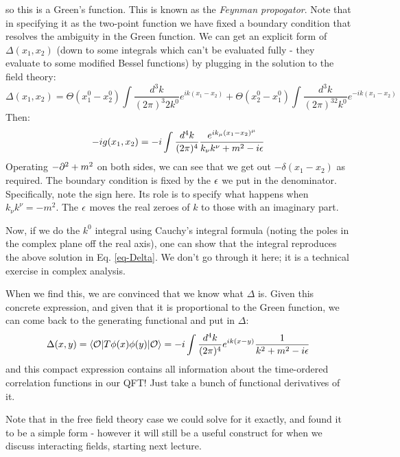 so this is a Green's function.
This is known as the \emph{Feynman propogator}. Note that in specifying it as the two-point function we have fixed a boundary condition that resolves the ambiguity in the Green function. We can get an explicit form of $\Delta(x_1, x_2)$ (down to some integrals which can't be evaluated fully - they evaluate to some modified Bessel functions) by plugging in the solution to the field theory:
\begin{equation}\label{eq-Delta}
    \Delta(x_1, x_2) = \Theta(x_1^0 - x_2^0) \int \frac{d^3k}{(2\pi)^3 2k^0}e^{ik(x_1 - x_2)} + \Theta(x_2^0 - x_1^0)\int \frac{d^3k}{(2\pi)^32k^0} e^{-ik(x_1 - x_2)}
\end{equation}
Then:
\begin{equation}
    -ig(x_1, x_2) = -i\int \frac{d^4k}{(2\pi)^4} \frac{e^{ik_\mu (x_1 - x_2)^\mu}}{k_\nu k^\nu + m^2 - i\epsilon}
\end{equation}
Operating $-\partial^2 + m^2$ on both sides, we can see that we get out $-\delta(x_1 - x_2)$ as required. The boundary condition is fixed by the $\epsilon$ we put in the denominator. Specifically, note the sign here. Its role is to specify what happens when $k_\nu k^\nu = -m^2$. The $\epsilon$ moves the real zeroes of $k$ to those with an imaginary part. 

Now, if we do the $k^0$ integral using Cauchy's integral formula (noting the poles in the complex plane off the real axis), one can show that the integral reproduces the above solution in Eq. \eqref{eq-Delta}. We don't go through it here; it is a technical exercise in complex analysis. 

When we find this, we are convinced that we know what $\Delta$ is. Given this concrete expression, and given that it is proportional to the Green function, we can come back to the generating functional and put in $\Delta$:
\begin{equation}
    \Delta(x, y) = \bra{\O}T\phi(x)\phi(y)\ket{\O} = -i \int \frac{d^4k}{(2\pi)^4}e^{ik(x - y)}\frac{1}{k^2 + m^2 - i\e}
\end{equation}
and this compact expression contains all information about the time-ordered correlation functions in our QFT! Just take a bunch of functional derivatives of it.

Note that in the free field theory case we could solve for it exactly, and found it to be a simple form - however it will still be a useful construct for when we discuss interacting fields, starting next lecture.

